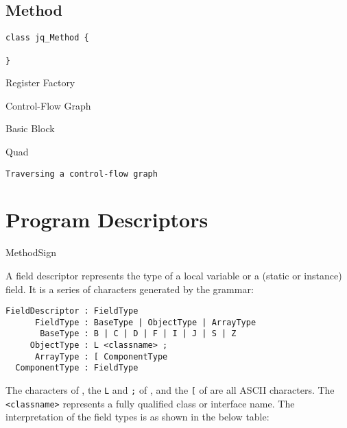 \subsection{Method}

\begin{framed}
\begin{verbatim}
class jq_Method {
    
}
\end{verbatim}
\end{framed}

Register Factory

Control-Flow Graph

Basic Block

Quad

\begin{framed}
\begin{verbatim}
Traversing a control-flow graph
\end{verbatim}
\end{framed}

\section{Program Descriptors}

MethodSign

A field descriptor represents the type of a local variable or a
(static or instance) field.  It is a series of characters generated by
the grammar:

\begin{framed}
\begin{verbatim}
FieldDescriptor : FieldType
      FieldType : BaseType | ObjectType | ArrayType
       BaseType : B | C | D | F | I | J | S | Z
     ObjectType : L <classname> ;
      ArrayType : [ ComponentType
  ComponentType : FieldType
\end{verbatim}
\end{framed}

The characters of , the {\tt L} and {\tt ;}
of , and the {\tt [} of
 are all ASCII characters.
The {\tt <classname>} represents a fully qualified class or interface
name.  The interpretation of the field types is as shown in the below
table:

